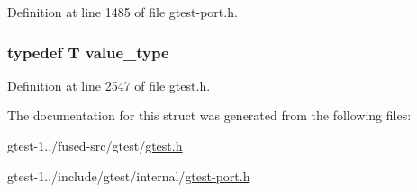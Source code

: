\-Definition at line 1485 of file gtest-\/port.\-h.

\hypertarget{structtesting_1_1internal_1_1IteratorTraits_3_01T_01_5_01_4_a265a253612b46abed17c61b0a5e5ce30}{
\subsubsection[{value\-\_\-type}]{\setlength{\rightskip}{0pt plus 5cm}typedef \-T {\bf value\-\_\-type}}}\label{d9/d76/structtesting_1_1internal_1_1IteratorTraits_3_01T_01_5_01_4_a265a253612b46abed17c61b0a5e5ce30}


\-Definition at line 2547 of file gtest.\-h.



\-The documentation for this struct was generated from the following files\-:\begin{DoxyCompactItemize}
\item 
gtest-\/1../fused-\/src/gtest/\hyperlink{fused-src_2gtest_2gtest_8h}{gtest.\-h}\item 
gtest-\/1../include/gtest/internal/\hyperlink{gtest-port_8h}{gtest-\/port.\-h}\end{DoxyCompactItemize}
